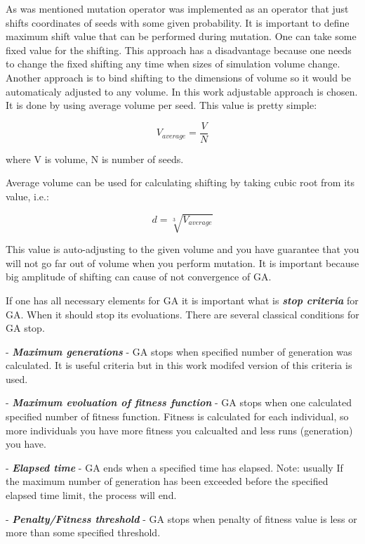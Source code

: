 \documentclass[12pt]{report}
\begin{document}
As was mentioned mutation operator was implemented as an operator that just shifts coordinates of seeds with some given probability. It is important to define maximum shift value that can be performed during mutation. One can take some fixed value for the shifting. This approach has a disadvantage because one needs to change the fixed shifting any time when sizes of simulation volume change. Another approach is to bind shifting to the dimensions of volume so it would be automaticaly adjusted to any volume. In this work adjustable approach is chosen. It is done by using average volume per seed. This value is pretty simple:

\begin{equation} \label{avgvolume}
V_{average} = \frac{V}{N}
\end{equation}
\bigbreak

where V is volume, N is number of seeds.

Average volume can be used for calculating shifting by taking cubic root from its value, i.e.:

\begin{equation} \label{shift}
d = \sqrt[3]{V_{average}}
\end{equation}
\bigbreak

This value is auto-adjusting to the given volume and you have guarantee that you will not go far out of volume when you perform mutation. It is important because big amplitude of shifting can cause of not convergence of GA.
 
If one has all necessary elements for GA it is important what is \textit{\textbf{stop criteria}} for GA. When it should stop its evoluations. There are several classical conditions for GA stop. 

- \textit{\textbf{Maximum generations}} - GA stops when specified number of generation was calculated. It is useful criteria but in this work modifed version of this criteria is used. 

- \textit{\textbf{Maximum evoluation of fitness function}} - GA stops when one calculated specified number of fitness function. Fitness is calculated for each individual, so more individuals you have more fitness you calcualted and less runs (generation) you have.

- \textit{\textbf{Elapsed time}} - GA ends when a specified time has elapsed.
Note: usually If the maximum number of generation has been exceeded before the specified elapsed time limit, the process will end.

- \textit{\textbf{Penalty/Fitness threshold}} - GA stops when penalty of fitness value is less or more than some specified threshold.
\end{document}
